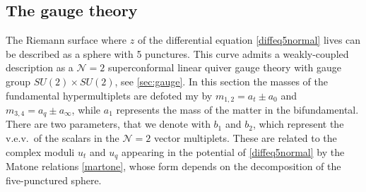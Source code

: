 \documentclass[11pt]{article}
\numberwithin{equation}{section}
\begin{document}
\subsection{The gauge theory}\label{sec:gaugefive}


The Riemann surface where $z$ of the differential equation \eqref{diffeq5normal}  lives can be described as a sphere with 5 punctures.
This curve admits a weakly-coupled description as a $\mathcal{N}=2$ superconformal linear quiver gauge theory with gauge group $SU(2)\times SU(2)$, see \autoref{sec:gauge}. In this section the masses of the fundamental hypermultiplets are defoted my by $m_{1,2}=a_t \pm a_0$ and $m_{3,4}=a_q \pm a_{\infty}$, while $a_1$ represents the mass of the matter in the bifundamental. There are two parameters, that we denote with $b_1$ and $b_2$, which represent the v.e.v.~of the scalars in the $\mathcal{N}=2$ vector multiplets. These  are related to the complex moduli $u_t$ and $u_q$ appearing in the potential of \eqref{diffeq5normal} by the Matone relations \eqref{martone}, whose form depends on the decomposition of the five-punctured sphere. 
\end{document}
